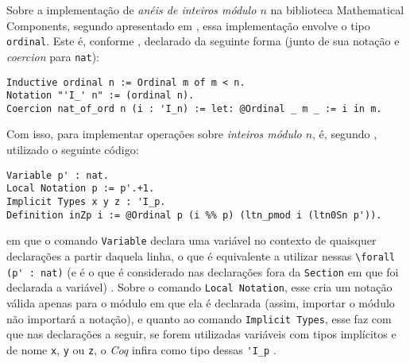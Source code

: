 Sobre a implementação de \textit{anéis de inteiros módulo $n$} na biblioteca Mathematical Components, segundo apresentado em \cite{assia_mahboubi_2022_7118596}, essa implementação envolve o tipo \lstinline[language = coq]{ordinal}. Este é, conforme \cite{assia_mahboubi_2022_7118596}, declarado da seguinte forma (junto de sua notação e \textit{coercion} para \lstinline[language=coq]|nat|):
    \begin{lstlisting}[language=coq,frame=single,tabsize=1]
Inductive ordinal n := Ordinal m of m < n.
Notation "'I_' n" := (ordinal n).
Coercion nat_of_ord n (i : 'I_n) := let: @Ordinal _ m _ := i in m.
    \end{lstlisting}
Com isso, para implementar operações sobre \textit{inteiros módulo $n$}, é, segundo \cite{assia_mahboubi_2022_7118596}, utilizado o seguinte código:
    \begin{lstlisting}[language=coq,frame=single,tabsize=1]
Variable p' : nat.
Local Notation p := p'.+1.
Implicit Types x y z : 'I_p.
Definition inZp i := @Ordinal p (i %% p) (ltn_pmod i (ltn0Sn p')).
    \end{lstlisting}
em que o comando \lstinline[language = coq]{Variable} declara uma variável no contexto de quaisquer declarações a partir daquela linha, o que é equivalente a utilizar nessas \lstinline[language = coq]{\forall (p' : nat)} (e é o que é considerado nas declarações fora da \lstinline[language = coq]{Section} em que foi declarada a variável) \cite{coqteam2022manual}. Sobre o comando \lstinline[language = coq]{Local Notation}, esse cria um notação válida apenas para o módulo em que ela é declarada (assim, importar o módulo não importará a notação), e quanto ao comando \lstinline[language = coq]{Implicit Types}, esse faz com que nas declarações a seguir, se forem utilizadas variáveis com tipos implícitos e de nome \lstinline[language = coq]{x}, \lstinline[language = coq]{y} ou \lstinline[language = coq]{z}, o \textit{Coq} infira como tipo dessas \lstinline[language = coq]{'I_p} \cite{coqteam2022manual}.

